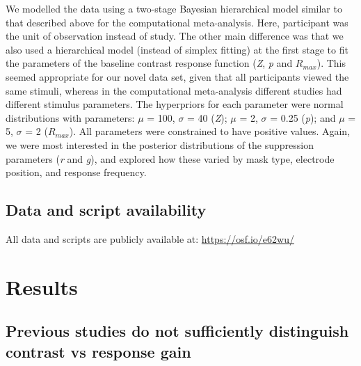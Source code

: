 \documentclass[]{article}
\begin{document}
We modelled the data using a two-stage Bayesian hierarchical model similar to that described above for the computational meta-analysis. Here, participant was the unit of observation instead of study. The other main difference was that we also used a hierarchical model (instead of simplex fitting) at the first stage to fit the parameters of the baseline contrast response function (\emph{Z}, \emph{p} and \(R_{max}\)). This seemed appropriate for our novel data set, given that all participants viewed the same stimuli, whereas in the computational meta-analysis different studies had different stimulus parameters. The hyperpriors for each parameter were normal distributions with parameters: \(\mu\) = 100, \(\sigma\) = 40 (\emph{Z}); \(\mu\) = 2, \(\sigma\) = 0.25 (\emph{p}); and \(\mu\) = 5, \(\sigma\) = 2 (\(R_{max}\)). All parameters were constrained to have positive values. Again, we were most interested in the posterior distributions of the suppression parameters (\emph{r} and \emph{g}), and explored how these varied by mask type, electrode position, and response frequency.

\hypertarget{data-and-script-availability}{%
\subsection{Data and script availability}\label{data-and-script-availability}}

All data and scripts are publicly available at: \url{https://osf.io/e62wu/}

\hypertarget{results}{%
\section{Results}\label{results}}

\hypertarget{previous-studies-do-not-sufficiently-distinguish-contrast-vs-response-gain}{%
\subsection{Previous studies do not sufficiently distinguish contrast vs response gain}\label{previous-studies-do-not-sufficiently-distinguish-contrast-vs-response-gain}}
\end{document}
